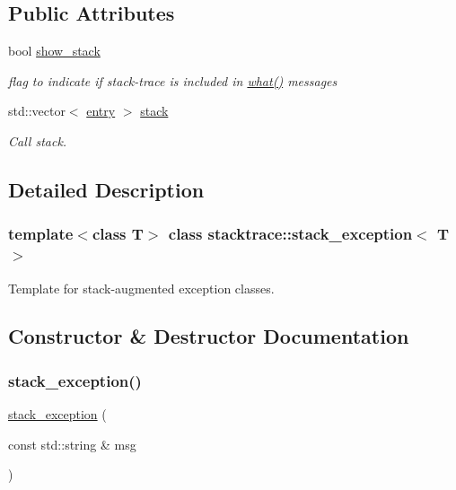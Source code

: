 \subsection*{Public Attributes}
\begin{DoxyCompactItemize}
\item 
bool \mbox{\hyperlink{classstacktrace_1_1stack__exception__base_a328e39311a54853f3f733b0a5be56a2a}{show\+\_\+stack}}
\begin{DoxyCompactList}\small\item\em flag to indicate if stack-\/trace is included in \mbox{\hyperlink{classstacktrace_1_1stack__exception__base_a926844cae0786e6c6192f557a12e39f0}{what()}} messages \end{DoxyCompactList}\item 
std\+::vector$<$ \mbox{\hyperlink{structstacktrace_1_1entry}{entry}} $>$ \mbox{\hyperlink{classstacktrace_1_1call__stack_a2a3ab0b5bb69cd4a275f3f344d3cc6cd}{stack}}
\begin{DoxyCompactList}\small\item\em Call stack. \end{DoxyCompactList}\end{DoxyCompactItemize}


\subsection{Detailed Description}
\subsubsection*{template$<$class T$>$\newline
class stacktrace\+::stack\+\_\+exception$<$ T $>$}

Template for stack-\/augmented exception classes. 



\subsection{Constructor \& Destructor Documentation}
\mbox{\label{classstacktrace_1_1stack__exception_abc5d5c322d59858f2736eddc4ec6d6f5}} 
\subsubsection{\texorpdfstring{stack\+\_\+exception()}{stack\_exception()}}
{\footnotesize\ttfamily \mbox{\hyperlink{classstacktrace_1_1stack__exception}{stack\+\_\+exception}} (\begin{DoxyParamCaption}\item[{const std\+::string \&}]{msg }\end{DoxyParamCaption})\hspace{0.3cm}{\ttfamily [inline]}}

